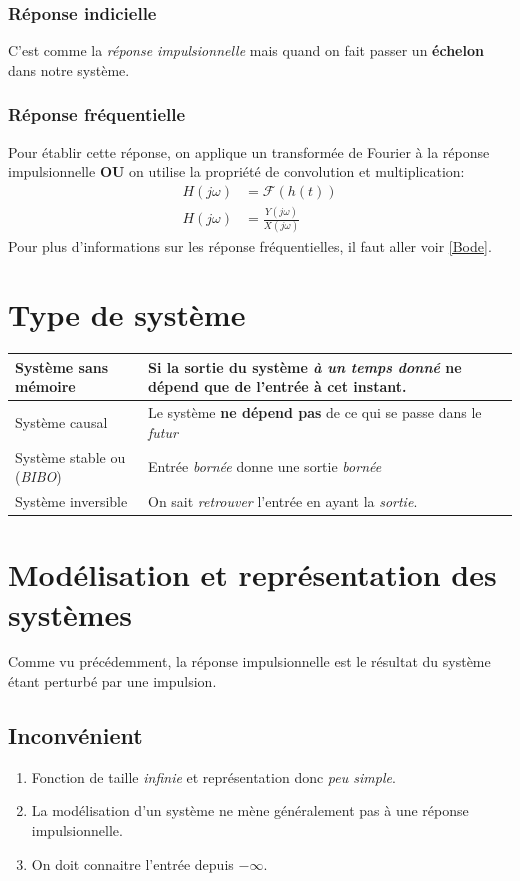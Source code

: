 \documentclass{report}
\begin{document}
\subsubsection{Réponse indicielle}
C'est comme la \textit{réponse impulsionnelle} mais quand on fait passer un \textbf{échelon} dans notre système.

\subsubsection{Réponse fréquentielle}
Pour établir cette réponse, on applique un transformée de Fourier à la réponse impulsionnelle \textbf{OU} on utilise la propriété de convolution et multiplication:
\begin{align*}
H(j \omega) &= \mathcal{F}(h(t))\\
H(j \omega) &= \frac{Y(j \omega)}{X(j \omega)}
\end{align*}
Pour plus d'informations sur les réponse fréquentielles, il faut aller voir \ref{Bode}.

\section{Type de système}
\begin{center}
\begin{tabular}{|m{4cm}|m{10cm}|}
	\hline
	Système sans mémoire & Si la sortie du système \textit{à un temps donné} ne dépend que de l'entrée à \textbf{cet instant}.\\
	\hline
	Système causal & Le système \textbf{ne dépend pas} de ce qui se passe dans le \textit{futur}\\
	\hline
	Système stable ou (\textit{BIBO}) & Entrée \textit{bornée} donne une sortie \textit{bornée}\\
	\hline
	Système inversible & On sait \textit{retrouver} l'entrée en ayant la \textit{sortie}.\\
	\hline

\end{tabular}
\end{center}

\section{Modélisation et représentation des systèmes}
Comme vu précédemment, la réponse impulsionnelle est le résultat du système étant perturbé par une impulsion. 
\subsection{Inconvénient}
\begin{enumerate}
\item Fonction de taille \textit{infinie} et représentation donc \textit{peu simple}.
\item La modélisation d'un système ne mène généralement pas à une réponse impulsionnelle.
\item On doit connaitre l'entrée depuis $-\infty$.
\end{enumerate}
\end{document}
